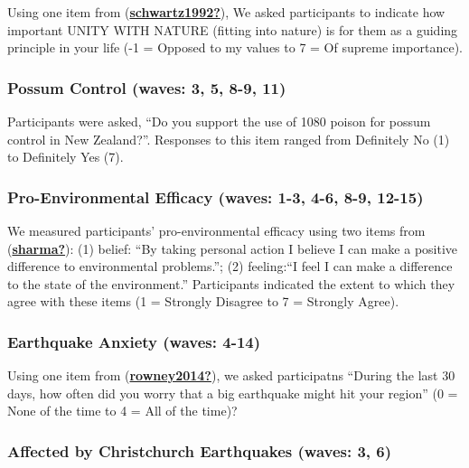 \documentclass[
  singlecolumn]{report}
\begin{document}
Using one item from
(\protect\hyperlink{ref-schwartz1992}{\textbf{schwartz1992?}}), We asked
participants to indicate how important UNITY WITH NATURE (fitting into
nature) is for them as a guiding principle in your life (-1 = Opposed to
my values to 7 = Of supreme importance).

\hypertarget{possum-control-waves-3-5-8-9-11}{%
\subsubsection{Possum Control (waves: 3, 5, 8-9,
11)}\label{possum-control-waves-3-5-8-9-11}}

Participants were asked, ``Do you support the use of 1080 poison for
possum control in New Zealand?''. Responses to this item ranged from
Definitely No (1) to Definitely Yes (7).

\hypertarget{pro-environmental-efficacy-waves-1-3-4-6-8-9-12-15}{%
\subsubsection{Pro-Environmental Efficacy (waves: 1-3, 4-6, 8-9,
12-15)}\label{pro-environmental-efficacy-waves-1-3-4-6-8-9-12-15}}

We measured participants' pro-environmental efficacy using two items
from (\protect\hyperlink{ref-sharma}{\textbf{sharma?}}): (1) belief:
``By taking personal action I believe I can make a positive difference
to environmental problems.''; (2) feeling:``I feel I can make a
difference to the state of the environment.'' Participants indicated the
extent to which they agree with these items (1 = Strongly Disagree to 7
= Strongly Agree).

\hypertarget{earthquake-anxiety-waves-4-14}{%
\subsubsection{Earthquake Anxiety (waves:
4-14)}\label{earthquake-anxiety-waves-4-14}}

Using one item from
(\protect\hyperlink{ref-rowney2014}{\textbf{rowney2014?}}), we asked
participatns ``During the last 30 days, how often did you worry that a
big earthquake might hit your region'' (0 = None of the time to 4 = All
of the time)?

\hypertarget{affected-by-christchurch-earthquakes-waves-3-6}{%
\subsubsection{Affected by Christchurch Earthquakes (waves: 3,
6)}\label{affected-by-christchurch-earthquakes-waves-3-6}}
\end{document}
